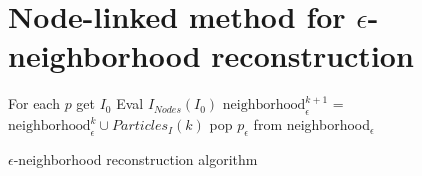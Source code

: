 \message{ !name(2020_EFM_MPM_Eigensoftening.tex)}\documentclass[preprint,12pt,a4paper]{elsarticle}
\begin{document}
\section{Node-linked method for $\epsilon$-neighborhood reconstruction}
\label{sec:node-linked-method-1}
\begin{algorithm}[H]
  \DontPrintSemicolon
  {
    For each $p$ get $I_0$\;
    Eval $I_{Nodes}(I_0)$ \;
    {
      $\text{neighborhood}_{\epsilon}^{k+1}$ = $\text{neighborhood}_{\epsilon}^{k} \cup Particles_I(k)$
    }
    {
      {
        pop $p_{\epsilon}$ from neighborhood$_{\epsilon}$\;
      }      
    }
    
  }  
  \caption{$\epsilon$-neighborhood reconstruction algorithm}
\end{algorithm} 

 
\end{document}
